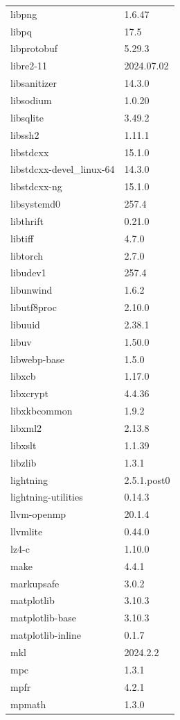 \begin{longtable}{ll}
    libpng&1.6.47 \\
    libpq&17.5 \\
    libprotobuf&5.29.3 \\
    libre2-11&2024.07.02 \\
    libsanitizer&14.3.0 \\
    libsodium&1.0.20 \\
    libsqlite&3.49.2 \\
    libssh2&1.11.1 \\
    libstdcxx&15.1.0 \\
    libstdcxx-devel\_linux-64&14.3.0 \\
    libstdcxx-ng&15.1.0 \\
    libsystemd0&257.4 \\
    libthrift&0.21.0 \\
    libtiff&4.7.0 \\
    libtorch&2.7.0 \\
    libudev1&257.4 \\
    libunwind&1.6.2 \\
    libutf8proc&2.10.0 \\
    libuuid&2.38.1 \\
    libuv&1.50.0 \\
    libwebp-base&1.5.0 \\
    libxcb&1.17.0 \\
    libxcrypt&4.4.36 \\
    libxkbcommon&1.9.2 \\
    libxml2&2.13.8 \\
    libxslt&1.1.39 \\
    libzlib&1.3.1 \\
    lightning&2.5.1.post0 \\
    lightning-utilities&0.14.3 \\
    llvm-openmp&20.1.4 \\
    llvmlite&0.44.0 \\
    lz4-c&1.10.0 \\
    make&4.4.1 \\
    markupsafe&3.0.2 \\
    matplotlib&3.10.3 \\
    matplotlib-base&3.10.3 \\
    matplotlib-inline&0.1.7 \\
    mkl&2024.2.2 \\
    mpc&1.3.1 \\
    mpfr&4.2.1 \\
    mpmath&1.3.0 \\

\end{longtable}
